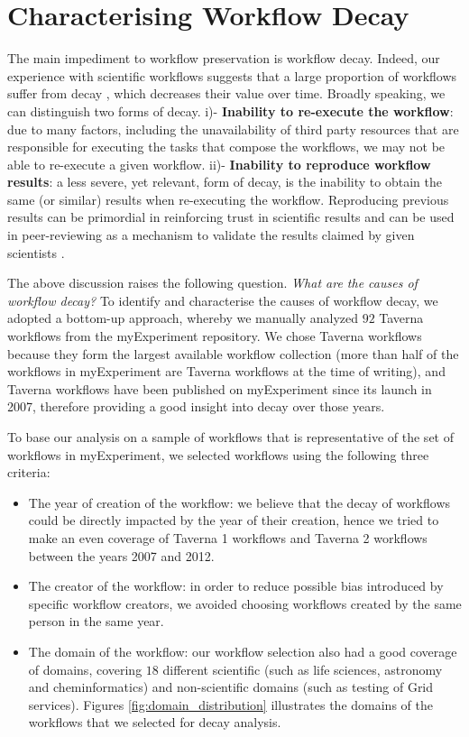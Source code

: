 \section{Characterising Workflow Decay}
\label{sec:decay}

The main impediment to workflow preservation is workflow decay. Indeed, our experience with scientific workflows suggests that a large proportion of workflows suffer from decay \cite{DBLP:conf/eScience/Belhajjame07}, which decreases their value over time. Broadly speaking, we can distinguish two forms of decay. i)- {\bf Inability to re-execute the workflow}: due to many factors, including the unavailability of third party resources that are responsible for executing the tasks that compose the workflows, we may not be able to re-execute a given workflow. ii)- {\bf Inability to reproduce workflow results}: a less severe, yet relevant, form of decay, is the inability to obtain the same (or similar) results when re-executing the workflow. Reproducing previous results can be primordial in reinforcing trust in scientific results and can be used in peer-reviewing as a mechanism to validate the results claimed by given scientists \cite{DBLP:journals/pvldb/FreireBS11,carole2011}. 

The above discussion raises the following question. {\em What are the causes of workflow decay?} To identify and characterise the causes of workflow decay, we adopted a bottom-up approach, whereby we manually analyzed $92$ Taverna workflows from the myExperiment repository. We chose Taverna workflows because they form the largest available workflow collection (more than half of the workflows in myExperiment are Taverna workflows at the time of writing), and Taverna workflows have been published on myExperiment since its launch in 2007, therefore providing a good insight into decay over those years. 

To base our analysis on a sample of workflows that is representative of the set of workflows in myExperiment, we selected workflows using the following three criteria: 
\begin{itemize}
\item
The year of creation of the workflow: we believe that the decay of workflows could be directly impacted by the year of their creation, hence we tried to make an even coverage of Taverna 1 workflows \cite{DBLP:journals/bioinformatics/OinnAFMSGCGPWL04} and Taverna 2 workflows \cite{DBLP:conf/ssdbm/MissierSOTNDWOG10} between the years 2007 and 2012.
\item
The creator of the workflow:  in order to reduce possible bias introduced by specific workflow creators, we avoided choosing workflows created by the same person in the same year.
\item
The domain of the workflow: our workflow selection also had a good coverage of domains, covering $18$ different scientific (such as life sciences, astronomy and cheminformatics) and non-scientific domains (such as testing of Grid services).  Figures \ref{fig:domain_distribution} illustrates the domains of the workflows that we selected for decay analysis.
\end{itemize}
 
